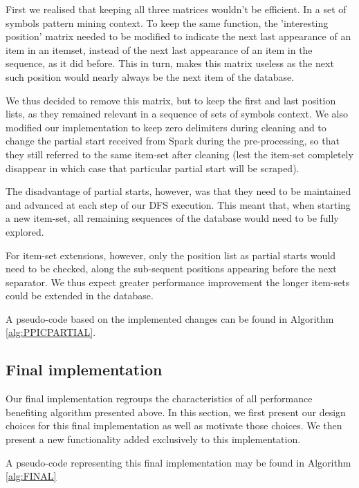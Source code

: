 \documentclass{eplmastersthesis}
\begin{document}
First we realised that keeping all three matrices wouldn't be efficient. In a set of symbols pattern mining context. To keep the same function, the 'interesting position' matrix needed to be modified to indicate the next last appearance of an item in an itemset, instead of the next last appearance of an item in the sequence, as it did before. This in turn, makes this matrix useless as the next such position would nearly always be the next item of the database. \newline

We thus decided to remove this matrix, but to keep the first and last position lists, as they remained relevant in a sequence of sets of symbols context.
We also modified our implementation to keep zero delimiters during cleaning and to change the partial start received from Spark during the pre-processing, so that they still referred to the same item-set after cleaning (lest the item-set completely disappear in which case that particular partial start will be scraped). \newline

The disadvantage of partial starts, however, was that they need to be maintained and advanced at each step of our DFS execution. This meant that, when starting a new item-set, all remaining sequences of the database would need to be fully explored. \newline

For item-set extensions, however, only the position list as partial starts would need to be checked, along the sub-sequent positions appearing before the next separator. We thus expect greater performance improvement the longer item-sets could be extended in the database. \newline

A pseudo-code based on the implemented changes can be found in Algorithm \ref{alg:PPICPARTIAL}.

\subsection{Final implementation}

Our final implementation regroups the characteristics of all performance benefiting algorithm presented above. In this section, we first present our design choices for this final implementation as well as motivate those choices. We then present a new functionality added exclusively to this implementation. \newline

A pseudo-code representing this final implementation may be found in Algorithm \ref{alg:FINAL}
\end{document}
